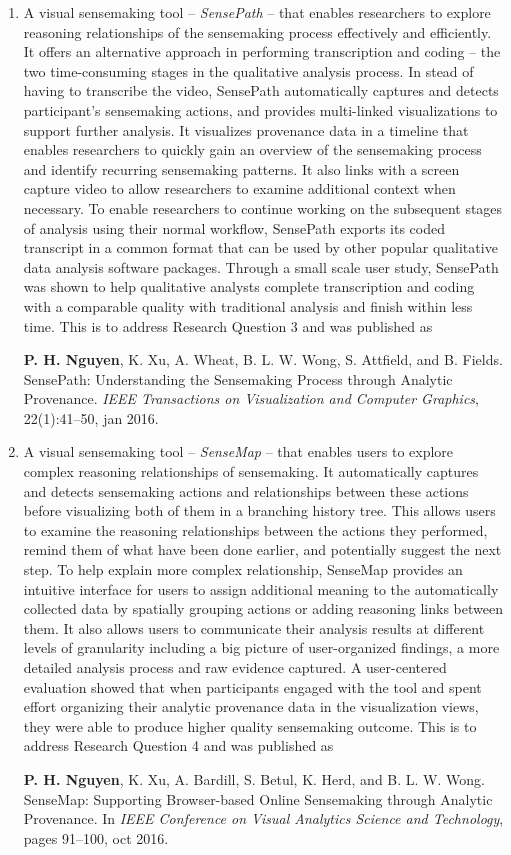 \begin{enumerate}
	\item A visual sensemaking tool -- \emph{SensePath} -- that enables researchers to explore reasoning relationships of the sensemaking process effectively and efficiently. It offers an alternative approach in performing transcription and coding -- the two time-consuming stages in the qualitative analysis process. In stead of having to transcribe the video, SensePath automatically captures and detects participant's sensemaking actions, and provides multi-linked visualizations to support further analysis. It visualizes provenance data in a timeline that enables researchers to quickly gain an overview of the sensemaking process and identify recurring sensemaking patterns. It also links with a screen capture video to allow researchers to examine  additional context when necessary. To enable researchers to continue working on the subsequent stages of analysis using their normal workflow, SensePath exports its coded transcript in a common format that can be used by other popular qualitative data analysis software packages. Through a small scale user study, SensePath was shown to help qualitative analysts complete transcription and coding with a comparable quality with traditional analysis and finish within less time. This is to address Research Question 3 and was published as

	\qquad\textbf{P. H. Nguyen}, K. Xu, A. Wheat, B. L. W. Wong, S. Attfield, and B. Fields. SensePath: Understanding the Sensemaking Process through Analytic Provenance. \textit{IEEE Transactions on Visualization and Computer Graphics}, 22(1):41--50, jan 2016.

	\item A visual sensemaking tool -- \emph{SenseMap} -- that enables users to explore complex reasoning relationships of sensemaking. It automatically captures and detects sensemaking actions and relationships between these actions before visualizing both of them in a branching history tree. This allows users to examine the reasoning relationships between the actions they performed, remind them of what have been done earlier, and potentially suggest the next step. To help explain more complex relationship, SenseMap provides an intuitive interface for users to assign additional meaning to the automatically collected data by spatially grouping actions or adding reasoning links between them. It also allows users to communicate their analysis results at different levels of granularity including a big picture of user-organized findings, a more detailed analysis process and raw evidence captured. A user-centered evaluation showed that when participants engaged with the tool and spent effort organizing their analytic provenance data in the visualization views, they were able to produce higher quality sensemaking outcome. This is to address Research Question 4 and was published as

	\qquad\textbf{P. H. Nguyen}, K. Xu, A. Bardill, S. Betul, K. Herd, and B. L. W. Wong. SenseMap: Supporting Browser-based Online Sensemaking through Analytic Provenance. In \textit{IEEE Conference on Visual Analytics Science and Technology}, pages 91--100, oct 2016.
\end{enumerate}

